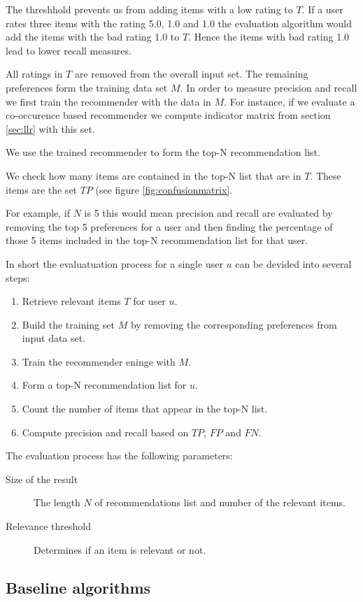 The threshhold prevents us from adding items with a low rating to $T$. If a user rates three items with the rating 5.0, 1.0 and 1.0 the evaluation algorithm would add the items with the bad rating 1.0 to $T$. Hence the items with bad rating 1.0 lead to lower recall measures. 

All ratings in $T$ are removed from the overall input set. The remaining preferences form the training data set $M$. In order to measure precision and recall we first train the recommender with the data in $M$. For instance, if we evaluate a co-occurence based recommender we compute indicator matrix from section \ref{sec:llr} with this set.

We use the trained recommender to form the top-N recommendation list. 

We check how many items are contained in the top-N list that are in $T$. These items are the set $TP$ (see figure \ref{fig:confusionmatrix}. 

For example, if $N$ is 5 this would mean precision and recall are evaluated by removing the top 5 preferences for a user and then finding the percentage of those 5 items included in the top-N recommendation list for that user. 

In short the evaluatuation process for a single user $u$ can be devided into several steps:
\begin{enumerate}
\item Retrieve relevant items $T$ for user $u$.
\item Build the training set $M$ by removing the corresponding preferences from input data set.
\item Train the recommender eninge with $M$.
\item Form a top-N recommendation list for $u$.
\item Count the number of items that appear in the top-N list.
\item Compute precision and recall based on $TP$, $FP$ and $FN$.
\end{enumerate}

The evaluation process has the following parameters:
\begin{description}
\item[Size of the result] The length $N$ of recommendations list and number of the relevant items. 
\item[Relevance threshold] Determines if an item is relevant or not.
\end{description}

\subsection{Baseline algorithms}
\label{sec:baseline}

